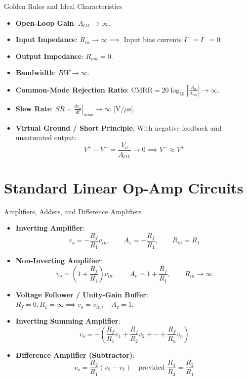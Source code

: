 \begin{formulabox}{Golden Rules and Ideal Characteristics}
\begin{itemize}[leftmargin=1.5em]
    \item \textbf{Open-Loop Gain}: $A_{OL} \to \infty$.
    \item \textbf{Input Impedance}: $R_{in} \to \infty \implies$ Input bias currents $I^+ = I^- = 0$.
    \item \textbf{Output Impedance}: $R_{out} = 0$.
    \item \textbf{Bandwidth}: $BW \to \infty$.
    \item \textbf{Common-Mode Rejection Ratio}: $\text{CMRR} = 20\log_{10}\left|\frac{A_d}{A_{cm}}\right| \to \infty$.
    \item \textbf{Slew Rate}: $SR = \left.\frac{dv_o}{dt}\right|_{max} \to \infty$ [$\text{V}/\mu\text{s}$].
    \item \textbf{Virtual Ground / Short Principle}: With negative feedback and unsaturated output:
    \[ V^+ - V^- = \frac{V_o}{A_{OL}} \to 0 \implies V^- \approx V^+ \]
\end{itemize}
\end{formulabox}

\section{Standard Linear Op-Amp Circuits}

\begin{formulabox}{Amplifiers, Adders, and Difference Amplifiers}
\begin{itemize}[leftmargin=1.5em]
    \item \textbf{Inverting Amplifier}:
    \[ v_o = -\frac{R_f}{R_1} v_{in}, \qquad A_v = -\frac{R_f}{R_1}, \qquad R_{in} = R_1 \]
    \item \textbf{Non-Inverting Amplifier}:
    \[ v_o = \left( 1 + \frac{R_f}{R_1} \right) v_{in}, \qquad A_v = 1 + \frac{R_f}{R_1}, \qquad R_{in} \to \infty \]
    \item \textbf{Voltage Follower / Unity-Gain Buffer}: $R_f = 0, R_1 = \infty \implies v_o = v_{in}, \quad A_v = 1$.
    \item \textbf{Inverting Summing Amplifier}:
    \[ v_o = -\left( \frac{R_f}{R_1} v_1 + \frac{R_f}{R_2} v_2 + \cdots + \frac{R_f}{R_n} v_n \right) \]
    \item \textbf{Difference Amplifier (Subtractor)}:
    \[ v_o = \frac{R_2}{R_1}(v_2 - v_1) \quad \text{provided } \frac{R_4}{R_3} = \frac{R_2}{R_1} \]
\end{itemize}
\end{formulabox}

